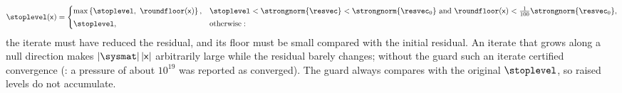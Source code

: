 \begin{equation}\label{eq:solvers:guard}
  \stoplevel(\mathsf{x})=\begin{cases}
    \max\curlypar{\stoplevel,\ \roundfloor(\mathsf{x})}, & \stoplevel<\strongnorm{\resvec}<\strongnorm{\resvec_0}\ \text{and}\ \roundfloor(\mathsf{x})<\tfrac{1}{100}\strongnorm{\resvec_0},\\[2pt]
    \stoplevel, & \text{otherwise}:
  \end{cases}
\end{equation}
the iterate must have reduced the residual, and its floor must be small
compared with the initial residual. An iterate that grows along a null
direction makes $\abs{\sysmat}\abs{\mathsf{x}}$ arbitrarily large while the
residual barely changes; without the guard such an iterate certified
convergence (: a pressure of about $10^{19}$ was reported as
converged). The guard always compares with the original $\stoplevel$, so
raised levels do not accumulate.

